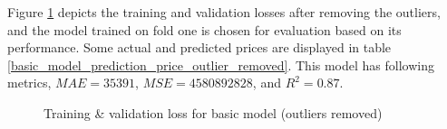 \documentclass[12pt,twoside]{report}
\begin{document}
Figure \ref{all_full_epoch_1000_outlier_removed} depicts the training and validation losses after removing the outliers, and the model trained on fold one is chosen for evaluation based on its performance. Some actual and predicted prices are displayed in table \ref{basic_model_prediction_price_outlier_removed}. This model has following metrics, $MAE = 35391$, $MSE = 4580892828$, and $R^2 = 0.87$. 
\begin{figure}[!htbp]
	\centering
	\hfill
	\hfill
	\hfil
	\hfil
	\caption{Training \& validation loss for basic model (outliers removed)}
	\label{all_full_epoch_1000_outlier_removed}
\end{figure}
\end{document}
